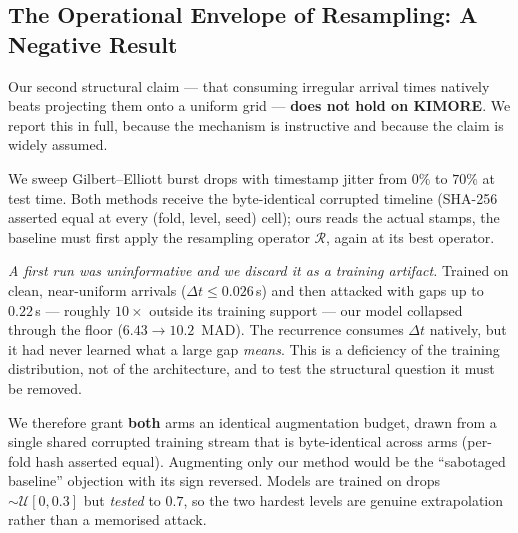 \documentclass[10pt,journal]{IEEEtran}
\begin{document}
\subsection{The Operational Envelope of Resampling: A Negative Result}
\label{sec:results:resampling}

Our second structural claim --- that consuming irregular arrival times natively beats projecting
them onto a uniform grid --- \textbf{does not hold on KIMORE}. We report this in full, because the
mechanism is instructive and because the claim is widely assumed.

We sweep Gilbert--Elliott burst drops with timestamp jitter from $0\%$ to $70\%$ at test time. Both
methods receive the byte-identical corrupted timeline (SHA-256 asserted equal at every
(fold, level, seed) cell); ours reads the actual stamps, the baseline must first apply the
resampling operator $\mathcal{R}$, again at its best operator.

\emph{A first run was uninformative and we discard it as a training artifact.} Trained on clean,
near-uniform arrivals ($\Delta t\!\le\!0.026$\,s) and then attacked with gaps up to $0.22$\,s ---
roughly $10\times$ outside its training support --- our model collapsed through the floor
($6.43\!\to\!10.2$~MAD). The recurrence consumes $\Delta t$ natively, but it had never learned what
a large gap \emph{means}. This is a deficiency of the training distribution, not of the
architecture, and to test the structural question it must be removed.

We therefore grant \textbf{both} arms an identical augmentation budget, drawn from a single shared
corrupted training stream that is byte-identical across arms (per-fold hash asserted equal).
Augmenting only our method would be the ``sabotaged baseline'' objection with its sign reversed.
Models are trained on drops $\sim\mathcal{U}[0,0.3]$ but \emph{tested} to $0.7$, so the two hardest
levels are genuine extrapolation rather than a memorised attack.
\end{document}
